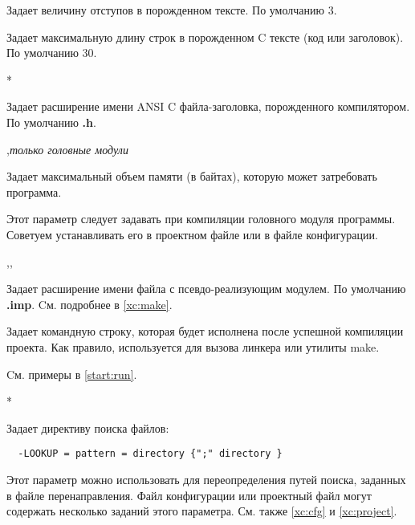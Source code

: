\begin{description}
\ifgenc
{}
        \MLBegin{}\ModeC{}\MLEnd{}

Задает величину отступов в порожденном тексте. По умолчанию 3.
\fi

\ifgenc
{}
        \MLBegin{}\ModeC{}\MLEnd{}

Задает максимальную длину строк в порожденном C тексте (код или заголовок).
По умолчанию 30.
\fi

\ifgenc
{}
        \MLBegin{}*\MLEnd{}

Задает расширение имени ANSI C файла-заголовка, порожденного компилятором.
По умолчанию {\bf .h}.
\fi

        \MLBegin{}\ModeC{},{\em только головные модули}\MLEnd{}

Задает максимальный объем памяти (в байтах), 
которую может затребовать программа.

Этот параметр следует задавать при компиляции головного модуля
программы. Советуем устанавливать его в проектном файле или в
файле конфигурации.

\ifcomment
{}
        \MLBegin{}\ModeM{},\ModeP{},\ModeG{}\MLEnd{}

Задает расширение имени файла с псевдо-реализующим модулем.
По умолчанию {\bf .imp}.
        Cм. подробнее в \ref{xc:make}.
\fi

        \MLBegin{}\ModeP{}\MLEnd{}

Задает командную строку, которая будет исполнена после успешной
компиляции проекта. Как правило, используется для вызова линкера 
или утилиты make.

        Cм. примеры в \ref{start:run}.

        \MLBegin{}*\MLEnd{}

Задает директиву поиска файлов:
\begin{verbatim}
  -LOOKUP = pattern = directory {";" directory }
\end{verbatim}

Этот параметр можно использовать для переопределения
путей поиска, заданных в файле перенаправления.
Файл конфигурации или проектный файл могут содержать
несколько заданий этого параметра.
        См. также \ref{xc:cfg} и \ref{xc:project}.

\ifgenvax
{}
        \MLBegin{}\ModeC{}\MLEnd{}
 

\end{description}
